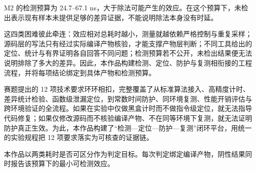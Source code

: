 M2 的检测预算为 24.7--67.1 ns，大于除法可能产生的效应。在这个预算下，未检出表示现有样本未提供足够的差异证据，不能说明除法本身没有时延。%

这四类困难彼此牵连：效应相对总耗时越小，测量就越依赖严格控制与重复采样；源码层的写法只有经过实际编译产物核验，才能支撑产物层判断；不同工具给出的定位、统计与有界证明各自回答不同问题；检测预算若不公开，未检出结果便无法说明排除了多大的差异。因此，本作品构建检测、定位、防护与复测相衔接的工程流程，并将每项结论绑定到具体产物和检测预算。

赛题提出的 12 项技术要求环环相扣，完整覆盖了从标准算法接入、高精度计时、差异统计检验、函数级泄漏定位，到常数时间防护、同环境复测、性能开销评估与跨环境验证的全流程。如果在实验中仅做黑盒计时而不做指令级定位，就无法指导代码修复；如果仅修改源码而不核验编译产物、不在同等环境下复测，就无法证明防护真正生效。为此，本作品构建了“检测—定位—防护—复测”闭环平台，用统一的实验规程把 12 项要求落实为可核查的证据链。

\begin{center}
\end{center}

本作品以两类耗时是否可区分作为判定目标。每次判定绑定编译产物，阴性结果同时报告该预算下的最小可检测效应。

